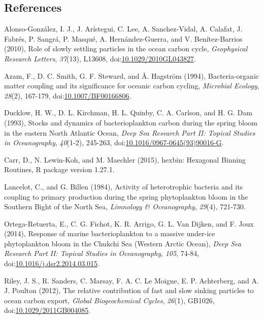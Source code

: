 \clearpage
\begin{singlespace}
\section*{References}
\addtocounter{section}{1}
{\setlength{\parindent}{0pt}
Alonso-Gonz\'{a}lez, I. J., J. Ar\'{i}stegui, C. Lee, A. Sanchez-Vidal, A. Calafat, J. Fabr\'{e}s, P. Sangr\'{a}, P. Masqu\'{e}, A. Hern\'{a}ndez-Guerra, and V. Ben\'{i}tez-Barrios (2010), Role of slowly settling particles in the ocean carbon cycle, \emph{Geophysical Research Letters}, \emph{37}(13), L13608, doi:\href{http://dx.doi.org/10.1029/2010GL043827}{10.1029/2010GL043827}.

{\setlength{\parskip}{10pt}

Azam, F., D. C. Smith, G. F. Steward, and \AA{}. Hagstr\"{o}m (1994), Bacteria-organic matter coupling and its significance for oceanic carbon cycling, \emph{Microbial Ecology}, \emph{28}(2), 167-179, doi:\href{http://dx.doi.org/10.1007/BF00166806}{10.1007/BF00166806}.

Ducklow, H. W., D. L. Kirchman, H. L. Quinby, C. A. Carlson, and H. G. Dam (1993), Stocks and dynamics of bacterioplankton carbon during the spring bloom in the eastern North Atlantic Ocean, \emph{Deep Sea Research Part II: Topical Studies in Oceanography}, \emph{40}(1-2), 245-263, doi:\href{http://dx.doi.org/10.1016/0967-0645(93)90016-G}{10.1016/0967-0645(93)90016-G}.

Carr, D., N. Lewin-Koh, and M. Maechler (2015), hexbin: Hexagonal Binning Routines, R package version 1.27.1. 

Lancelot, C., and G. Billen (1984), Activity of heterotrophic bacteria and its coupling to primary production during the spring phytoplankton bloom in the Southern Bight of the North Sea, \emph{Limnology \& Oceanography}, \emph{29}(4), 721-730.

Ortega-Retuerta, E., C. G. Fichot, K. R. Arrigo, G. L. Van Dijken, and F. Joux (2014), Response of marine bacterioplankton to a massive under-ice phytoplankton bloom in the Chukchi Sea (Western Arctic Ocean), \emph{Deep Sea Research Part II: Topical Studies in Oceanography}, \emph{105}, 74-84, doi:\href{http://dx.doi.org/10.1016/j.dsr2.2014.03.015}{10.1016/j.dsr2.2014.03.015}.

Riley, J. S., R. Sanders, C. Marsay, F. A. C. Le Moigne, E. P. Achterberg, and A. J. Poulton (2012), The relative contribution of fast and slow sinking particles to ocean carbon export, \emph{Global Biogeochemical Cycles}, \emph{26}(1), GB1026, doi:\href{http://dx.doi.org/10.1029/2011GB004085}{10.1029/2011GB004085}.

}}
\end{singlespace}
